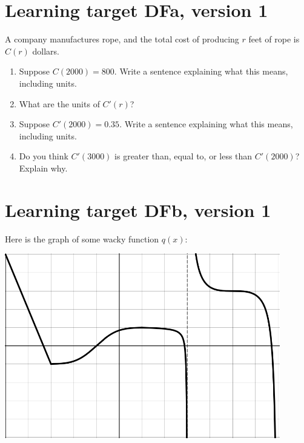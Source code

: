 \pagebreak

\section{Learning target DFa, version 1}

A company manufactures rope, and the total cost of producing $r$ feet of rope is $C(r)$ dollars.
\begin{enumerate}[leftmargin=0pt]
    \item Suppose $C(2000) = 800$. Write a sentence explaining what this means, including units.
    \vfill
    \item What are the units of $C'(r)$?
    \vfill
    \item Suppose $C'(2000) = 0.35$. Write a sentence explaining what this means, including units.
    \vfill
    \item Do you think $C'(3000)$ is greater than, equal to, or less than $C'(2000)$? Explain why.
    \vfill
\end{enumerate}

\pagebreak

\section{Learning target DFb, version 1}

Here is the graph of some wacky function $q(x)$:

\begin{center}
    \includegraphics[width=0.9\textwidth]{../images/DFb-v1.png}    
\end{center}


